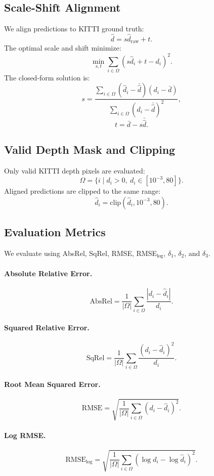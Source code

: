 \documentclass[10pt]{article}
\begin{document}
\subsection{Scale-Shift Alignment}

We align predictions to KITTI ground truth:
\[
\hat d = s\hat d_{\text{raw}} + t.
\]
The optimal scale and shift minimize:
\[
\min_{s,t}
\sum_{i\in\Omega}
(s\hat d_i+t-d_i)^2.
\]
The closed-form solution is:
\[
s=
\frac{
\sum_{i\in\Omega}
(\hat d_i-\bar{\hat d})
(d_i-\bar d)
}{
\sum_{i\in\Omega}
(\hat d_i-\bar{\hat d})^2
},
\]
\[
t=\bar d-s\bar{\hat d}.
\]

\subsection{Valid Depth Mask and Clipping}

Only valid KITTI depth pixels are evaluated:
\[
\Omega =
\{i \mid d_i > 0,\ d_i \in [10^{-3}, 80]\}.
\]
Aligned predictions are clipped to the same range:
\[
\hat d_i = \mathrm{clip}(\hat d_i, 10^{-3}, 80).
\]

\subsection{Evaluation Metrics}

We evaluate using AbsRel, SqRel, RMSE, RMSE$_{\log}$, $\delta_1$, $\delta_2$, and $\delta_3$.

\paragraph{Absolute Relative Error.}
\[
\mathrm{AbsRel}
=
\frac1{|\Omega|}
\sum_{i\in\Omega}
\frac{|d_i-\hat d_i|}{d_i}.
\]

\paragraph{Squared Relative Error.}
\[
\mathrm{SqRel}
=
\frac1{|\Omega|}
\sum_{i\in\Omega}
\frac{(d_i-\hat d_i)^2}{d_i}.
\]

\paragraph{Root Mean Squared Error.}
\[
\mathrm{RMSE}
=
\sqrt{
\frac1{|\Omega|}
\sum_{i\in\Omega}
(d_i-\hat d_i)^2
}.
\]

\paragraph{Log RMSE.}
\[
\mathrm{RMSE}_{\log}
=
\sqrt{
\frac1{|\Omega|}
\sum_{i\in\Omega}
(\log d_i - \log \hat d_i)^2
}.
\]
\end{document}

